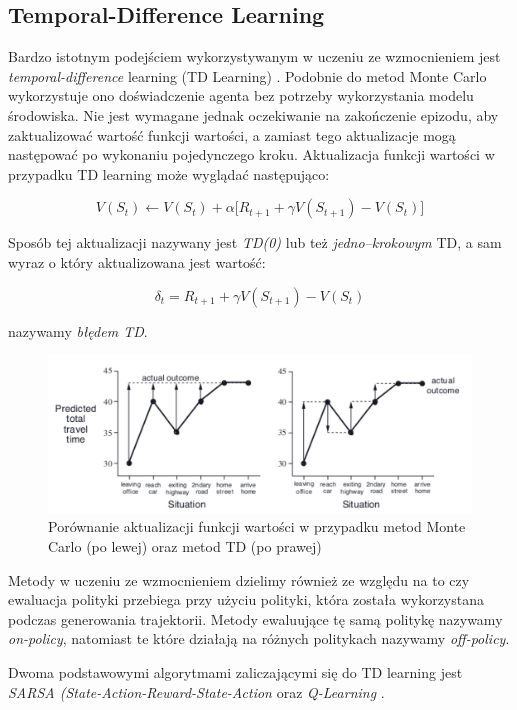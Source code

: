\documentclass[licencjacka]{pracamgr}
\begin{document}
\subsection{Temporal-Difference Learning} 

Bardzo istotnym podejściem wykorzystywanym w uczeniu ze wzmocnieniem jest \emph{temporal-difference} learning (TD Learning) \cite{TD}. Podobnie do metod Monte Carlo wykorzystuje ono doświadczenie agenta bez potrzeby wykorzystania modelu środowiska. Nie jest wymagane jednak oczekiwanie na zakończenie epizodu, aby zaktualizować wartość funkcji wartości, a zamiast tego aktualizacje mogą następować po wykonaniu pojedynczego kroku. Aktualizacja funkcji wartości w przypadku TD learning może wyglądać następująco:

$$ V(S_t) \leftarrow V(S_t) + \alpha \big[R_{t+1} + \gamma V(S_{t+1}) - V(S_t) \big] $$

Sposób tej aktualizacji nazywany jest \emph{TD(0)} lub też \emph{jedno--krokowym} TD, a sam wyraz o który aktualizowana jest wartość:

$$ \delta_t = R_{t+1} + \gamma V(S_{t+1}) - V(S_t) $$

nazywamy \emph{błędem TD}.

\begin{figure}[ht]
  \centering
  \includegraphics[width=1.0\textwidth]{mc_td}
  \caption{Porównanie aktualizacji funkcji wartości w przypadku metod Monte Carlo (po lewej) oraz metod TD (po prawej)}
\end{figure}

Metody w uczeniu ze wzmocnieniem dzielimy również ze względu na to czy ewaluacja polityki przebiega przy użyciu polityki, która została wykorzystana podczas generowania trajektorii. Metody ewaluujące tę samą politykę nazywamy \emph{on-policy}, natomiast te które działają na różnych politykach nazywamy \emph{off-policy}.

Dwoma podstawowymi algorytmami zaliczającymi się do TD learning jest \emph{SARSA (State-Action-Reward-State-Action} \cite{SARSA} oraz \emph{Q-Learning} \cite{Q-learning}.
\end{document}
